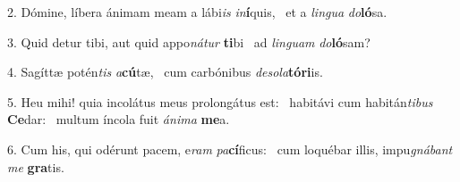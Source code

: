 2. Dómine, líbera ánimam meam a lábi\textit{is} \textit{in}\textbf{í}quis, \ast\  et a \textit{lin}\textit{gua} \textit{do}\textbf{ló}sa.\

3. Quid detur tibi, aut quid appo\textit{ná}\textit{tur} \textbf{ti}bi \ast\  ad \textit{lin}\textit{guam} \textit{do}\textbf{ló}sam?\

4. Sagíttæ potén\textit{tis} \textit{a}\textbf{cú}tæ, \ast\  cum carbónibus \textit{de}\textit{so}\textit{la}\textbf{tó}\textbf{ri}is.\

5. Heu mihi! quia incolátus meus prolongátus est: \dag\  habitávi cum habitán\textit{ti}\textit{bus} \textbf{Ce}dar: \ast\  multum íncola fuit \textit{á}\textit{ni}\textit{ma} \textbf{me}a.\

6. Cum his, qui odérunt pacem, e\textit{ram} \textit{pa}\textbf{cí}ficus: \ast\  cum loquébar illis, impu\textit{gná}\textit{bant} \textit{me} \textbf{gra}tis.\

